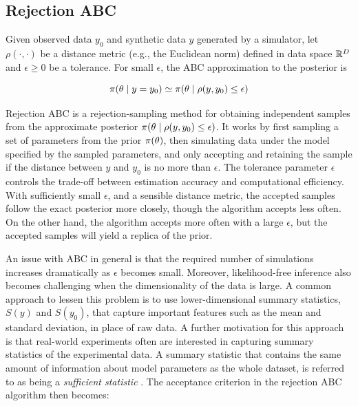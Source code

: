 \subsection{Rejection ABC}\label{sec:rejection_abc}

Given observed data $y_0$ and synthetic data $y$ generated by a simulator, let $\rho (\cdot, \cdot)$ be a distance metric (e.g., the Euclidean norm) defined in data space $\mathbb{R}^D$ and $\epsilon \geq 0$ be a tolerance. For small $\epsilon$, the ABC approximation to the posterior is 

\begin{equation}
    \pi \qty(\theta \mid y=y_0) \simeq \pi \qty(\theta \mid \rho \qty(y, y_0) \leq \epsilon)
\end{equation}


Rejection ABC is a rejection-sampling method for obtaining independent samples from the approximate posterior $ \pi \qty(\theta \mid \rho \qty(y, y_0) \leq \epsilon)$. It works by first sampling a set of parameters from the prior $\pi \qty(\theta)$, then simulating data under the model specified by the sampled parameters, and only accepting and retaining the sample if the distance between $y$ and $y_0$ is no more than $\epsilon$. The tolerance parameter $\epsilon$ controls the trade-off between estimation accuracy and computational efficiency. With sufficiently small $\epsilon$, and a sensible distance metric, the accepted samples follow the exact posterior more closely, though the algorithm accepts less often. On the other hand, the algorithm accepts more often with a large $\epsilon$, but the accepted samples will yield a replica of the prior.

An issue with ABC in general is that the required number of simulations increases dramatically as $\epsilon$ becomes small. Moreover, likelihood-free inference also becomes challenging when the dimensionality of the data is large. A common approach to lessen this problem is to use lower-dimensional summary statistics, $S(y)$ and $S(y_0)$, that capture important features such as the mean and standard deviation, in place of raw data. %
A further motivation for this approach is that real-world experiments often are interested in capturing summary statistics of the experimental data. A summary statistic that contains the same amount of information about model parameters as the whole dataset, is referred to as being a \textit{sufficient statistic} \cite{ABCprimer}. The acceptance criterion in the rejection ABC algorithm then becomes:

